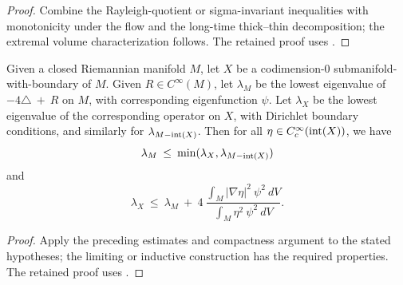 \begin{proof}
\sketch Combine the Rayleigh-quotient or sigma-invariant inequalities with monotonicity under the flow and the long-time thick--thin decomposition; the extremal volume characterization follows.
The retained proof uses \cite[Pf. of Theorem 2.9]{Anderson}.
\end{proof}

\begin{lemma}
  \label{lem:kl-alternative-proof-cusp-incompressibility-estimates-spectral-geometry}
 \label{newprop1}
Given a closed Riemannian manifold $M$, let $X$ be a codimension-$0$
submanifold-with-boundary of $M$. Given $R \in C^\infty(M)$, let
$\lambda_M$ be the lowest eigenvalue of $-4\triangle \: + \: R$
on $M$, with corresponding eigenfunction $\psi$.
Let $\lambda_X$ be the lowest eigenvalue of the corresponding
operator on $X$, with Dirichlet boundary conditions, and similarly
for $\lambda_{M - \operatorname{int}(X)}$. Then for all
$\eta \in C^\infty_c(\operatorname{int}(X))$, we have
\begin{equation} \label{eig1}
\lambda_M \: \le \: \min(\lambda_X, \lambda_{M - \operatorname{int}(X)})
\end{equation}
and
\begin{equation} \label{eig2}
\lambda_X \: \le \: \lambda_M \: + \: 4 \:
\frac{\int_M |\nabla \eta|^2 \: \psi^2 \: dV}{\int_M \eta^2 \:
\psi^2 \: dV}.
\end{equation}
\end{lemma}

\begin{proof}
\sketch Apply the preceding estimates and compactness argument to the stated hypotheses; the limiting or inductive construction has the required properties.
The retained proof uses \cite[Chapter XIII.15]{Reed-Simon}.
\end{proof}

